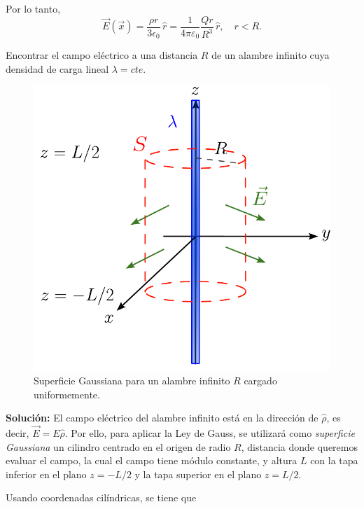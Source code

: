 \begin{ejemplo}
\begin{itemize}
Por lo tanto, 
$$\vec{E}(\vec{x}) = \frac{ \rho r}{3 \epsilon_0} \, \hat{r} = \frac{1}{4\pi \varepsilon_0} \frac{Qr}{R^3} \,\hat{r}, \quad r < R .$$
\end{itemize}
\end{ejemplo} 


\begin{ejemplo}
     Encontrar el campo eléctrico a una distancia $R$ de un alambre infinito cuya densidad de carga lineal $\lambda = cte$.

\begin{figure}[H]
    \centering
    \includegraphics[scale = 0.65]{Figuras/Ej-Gauss-2.pdf}
    \caption{Superficie Gaussiana para un alambre infinito $R$ cargado uniformemente.}
    \label{fig:Ej-Gauss-2}
\end{figure}

\textbf{Solución:} El campo eléctrico del alambre infinito está en la dirección de $\hat{\rho}$, es decir, $\vec{E} = E \hat{\rho}$. Por ello, para aplicar la Ley de Gauss, se utilizará como \textit{superficie Gaussiana} un cilindro centrado en el origen de radio $R$, distancia donde queremos evaluar el campo, la cual el campo tiene módulo constante, y altura $L$ con la  tapa inferior en el plano $z = -L/2$ y la tapa superior en el plano $z = L/2$.

Usando coordenadas cilíndricas, se tiene que


\end{ejemplo}
